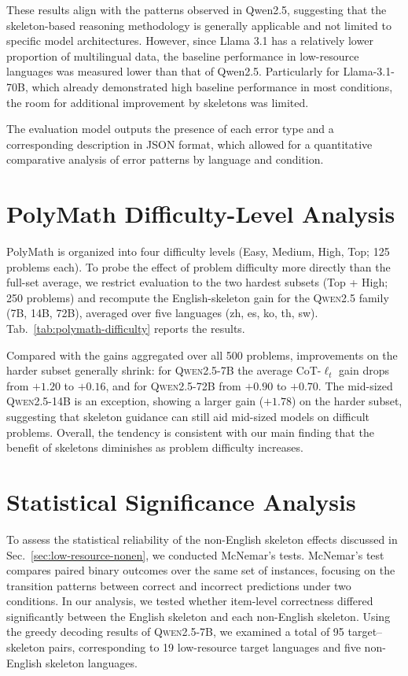 These results align with the patterns observed in Qwen2.5, suggesting that the skeleton-based reasoning methodology is generally applicable and not limited to specific model architectures. However, since Llama 3.1 has a relatively lower proportion of multilingual data, the baseline performance in low-resource languages was measured lower than that of Qwen2.5. Particularly for Llama-3.1-70B, which already demonstrated high baseline performance in most conditions, the room for additional improvement by skeletons was limited.


The evaluation model outputs the presence of each error type and a corresponding description in JSON format, which allowed for a quantitative comparative analysis of error patterns by language and condition.

 \section{PolyMath Difficulty-Level Analysis}
\label{app:polymath-difficulty}


PolyMath is organized into four difficulty levels (Easy, Medium, High, Top; 125 problems each). To probe the effect of problem difficulty more directly than the full-set average, we restrict evaluation to the two hardest subsets (Top + High; 250 problems) and recompute the English-skeleton gain for the \textsc{Qwen2.5} family (7B, 14B, 72B), averaged over five languages (zh, es, ko, th, sw). Tab.~\ref{tab:polymath-difficulty} reports the results.

Compared with the gains aggregated over all 500 problems, improvements on the harder subset generally shrink: for \textsc{Qwen2.5-7B} the average CoT-$\ell_t$ gain drops from $+1.20$ to $+0.16$, and for \textsc{Qwen2.5-72B} from $+0.90$ to $+0.70$. The mid-sized \textsc{Qwen2.5-14B} is an exception, showing a larger gain ($+1.78$) on the harder subset, suggesting that skeleton guidance can still aid mid-sized models on difficult problems. Overall, the tendency is consistent with our main finding that the benefit of skeletons diminishes as problem difficulty increases.

\section{Statistical Significance Analysis}
\label{app:stats}



To assess the statistical reliability of the non-English skeleton effects discussed in Sec.~\ref{sec:low-resource-nonen}, we conducted McNemar's tests. McNemar's test compares paired binary outcomes over the same set of instances, focusing on the transition patterns between correct and incorrect predictions under two conditions. In our analysis, we tested whether item-level correctness differed significantly between the English skeleton and each non-English skeleton. Using the greedy decoding results of \textsc{Qwen2.5-7B}, we examined a total of 95 target--skeleton pairs, corresponding to 19 low-resource target languages and five non-English skeleton languages.

